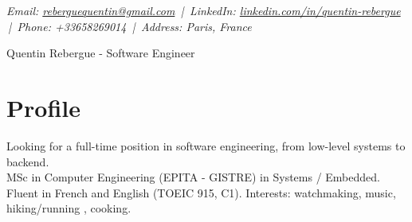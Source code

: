 \documentclass[9pt,a4paper]{article}
\newcommand{\namefont}{\fontsize{18}{22}\selectfont}
\newcommand{\tinyscript}{\fontsize{8}{8}\selectfont}
\begin{document}
\renewcommand\normalsize{\fontsize{10.5}{15}\selectfont}
\normalsize

\begin{center}
  {\tinyscript\itshape
  Email: \href{mailto:reberguequentin@gmail.com}{reberguequentin@gmail.com} \,|\,
  LinkedIn: \href{https://linkedin.com/in/quentin-rebergue}{linkedin.com/in/quentin-rebergue} \,|\,
  Phone: +33658269014 \,|\,
  Address: Paris, France}
\end{center}

\begin{center}
  {\namefont Quentin Rebergue - Software Engineer}
\end{center}

\section*{Profile}
\begin{tcolorbox}[mybox2]
Looking for a full-time position in software engineering, from low-level systems to backend.\\[0.3em]
MSc in Computer Engineering (EPITA - GISTRE) in Systems / Embedded.\\[0.3em]
Fluent in French and English (TOEIC 915, C1). Interests: watchmaking, music, hiking/running , cooking.
\end{tcolorbox}
\end{document}
